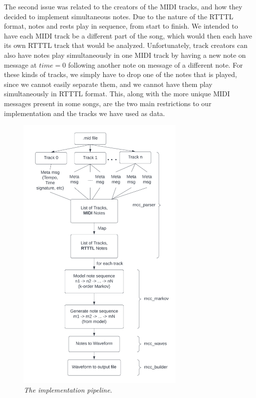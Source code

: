 \documentclass{article}
\begin{document}
The second issue was related to the creators of the MIDI tracks, and how they decided to implement simultaneous notes. Due to the nature of the RTTTL format, notes and rests 
play in sequence, from start to finish. We intended to have each MIDI track be a different part of the song, which would then each have its own RTTTL track that would be 
analyzed. Unfortunately, track creators can also have notes play simultaneously in one MIDI track by having a new note on message at $time = 0$ following another note on message 
of a different note. For these kinds of tracks, we simply have to drop one of the notes that is played, since we cannot easily separate them, and we cannot have them play 
simultaneously in RTTTL format. This, along with the more unique MIDI messages present in some songs, are the two main restrictions to our implementation and the tracks we 
have used as data. \\


\begin{figure} 
\includegraphics[width=230pt]{figs/roadmap.png} 
\caption{\small \sl The implementation pipeline.\label{fig:roadmap}} 
\end{figure} 
\end{document}
